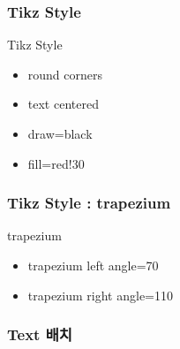 \documentclass[ aspectratio=169,  10pt,blue,xcolor=pdftex,dvipsnames,table,handout,notes]{beamer}
\begin{document}
		\begin{frame}[t]
		\frametitle{Tikz Style}

			\begin{block}{Tikz Style}
			\begin{itemize}
			\item[] 	round corners
			\item[] 	text centered
			\item[] 	draw=black
			\item[] 	fill=red!30
			\end{itemize}
			\end{block}


		\note[item]{}
		\end{frame}



		\begin{frame}[t]
		\frametitle{Tikz Style : trapezium }

			\begin{block}{trapezium}
			\begin{itemize}
			\item[] 	trapezium left angle=70
			\item[] 	trapezium right angle=110
			\end{itemize}
			\end{block}


		\note[item]{}
		\end{frame}

		\begin{frame}[plain]

			\centering
			\scalebox{4}{Text}
	
		\note[item]{ }
		\end{frame}



		\begin{frame}[t]
		\frametitle{Text 배치}



		\note[item]{}
		\end{frame}
\end{document}
